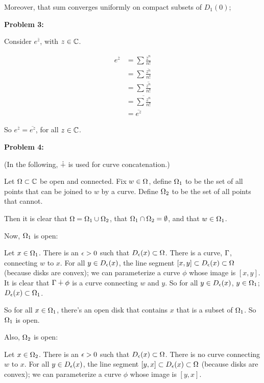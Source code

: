 \documentclass[a4paper,12pt]{article}
\begin{document}
Moreover, that sum converges uniformly on compact subsets of $D_1(0)$; %

\shunt

{\bf Problem 3:}

Consider $e^{\overline{z}}$, with $z \in \mathbb{C}$.

\begin{align*}
e^{\overline{z}} &= \sum \frac{\overline{z}^n}{n!} \\
&= \sum \frac{\overline{z^n}}{n!}\\
&= \sum \overline{\frac{z^n}{n!}}\\
&= \overline{\sum\frac{z^n}{n!}}\\
&= \overline{e^z}
\end{align*}

So $e^{\overline{z}} = \overline{e^z}$, for all $z \in \mathbb{C}$.

\shunt

{\bf Problem 4:}

(In the following, $\dotplus$ is used for curve concatenation.)

Let $\Omega \subset \mathbb{C}$ be open and connected. Fix $w \in \Omega$, define $\Omega_1$ to be the set of all points that can be joined to $w$ by a curve. Define $\Omega_2$ to be the set of all points that cannot.

Then it is clear that $\Omega=\Omega_1 \cup \Omega_2$, that $\Omega_1 \cap \Omega_2 = \emptyset$, and that $w \in \Omega_1$.

Now, $\Omega_1$ is open:

\tab Let $x \in \Omega_1$. There is an $\epsilon>0$ such that $D_\epsilon(x) \subset \Omega$. There is a curve, $\Gamma$, connecting $w$ to $x$. For all $y \in D_\epsilon(x)$, the line segment $[x,y] \subset D_\epsilon(x) \subset \Omega$ (because disks are convex); we can parameterize a curve $\phi$ whose image is $[x,y]$. It is clear that $\Gamma \dotplus \phi$ is a curve connecting $w$ and $y$. So for all $y \in D_\epsilon(x)$, $y \in \Omega_1$; $D_\epsilon(x) \subset \Omega_1$.

\tab So for all $x \in \Omega_1$, there's an open disk that contains $x$ that is a subset of $\Omega_1$. So $\Omega_1$ is open.

Also, $\Omega_2$ is open: 

\tab Let $x \in \Omega_2$. There is an $\epsilon>0$ such that $D_\epsilon(x) \subset \Omega$. There is no curve connecting $w$ to $x$. For all $y \in D_\epsilon(x)$, the line segment $[y,x] \subset D_\epsilon(x) \subset \Omega$ (because disks are convex); we can parameterize a curve $\phi$ whose image is $[y,x]$. 
\end{document}

